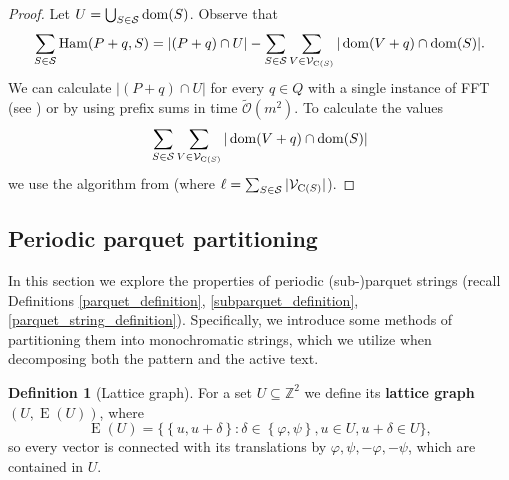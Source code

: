 \documentclass[11pt]{article}
\newcommand{\Z}{\mathbb{Z}}
\newcommand{\tO}{\tilde{\mathcal{O}}}
\renewcommand{\phi}{\varphi}
\newcommand{\set}[1]{\left\lbrace #1 \right\rbrace}
\newcommand{\bigset}[1]{\big \lbrace #1 \big \rbrace}
\theoremstyle{plain}
\theoremstyle{definition}
\newtheorem{definition}{Definition}
\theoremstyle{remark}
\DeclareMathOperator*{\Edges}{E}
\DeclareMathOperator*{\Ham}{Ham}
\begin{document}
\SparseAlgo
\begin{proof}
	Let $U = \bigcup_{S \in \mathcal{S}} \operatorname*{dom}(S)$. Observe that
	\[ \sum_{S \in \S} \Ham(P + q, S) = |(P + q) \cap U| - \sum_{S \in \S}\sum_{V \in \V_{\getchar{S}}} |\d{V + q} \cap \d{S}|.\]
	We can calculate $|(P + q) \cap U|$ for every $q \in Q$ with a single instance of FFT (see ) or by using prefix sums in time $\tO(m^2)$.
	To calculate the values
	\[ \sum_{S \in \mathcal{S}}\sum_{V \in \mathcal{V}_{\operatorname*{C}(S)}} |\operatorname*{dom}(V + q) \cap \operatorname*{dom}(S)| \]
	we use the algorithm from  (where $\ell = \sum_{S \in \mathcal{S}} |\mathcal{V}_{\operatorname*{C}(S)}|$).
\end{proof}


\subsection{Periodic parquet partitioning} \label{parquet_decomposition_proof}
In this section we explore the properties of periodic (sub-)parquet strings (recall Definitions \ref{parquet_definition}, \ref{subparquet_definition}, \ref{parquet_string_definition}).
Specifically, we introduce some methods of partitioning them into monochromatic strings, which we utilize when decomposing both the pattern and the active text.

\begin{definition}[Lattice graph]
	For a set $U \subseteq \Z^2$ we define its \textbf{lattice graph} $(U, \Edges(U))$, where
	\[ \Edges(U) = \bigset{\set{u, u + \delta} : \delta \in \set{\phi, \psi}, u \in U, u + \delta \in U},\] 
	so every vector is connected with its translations by $\phi, \psi, -\phi, -\psi$, which are contained in $U$.
\end{definition}
\end{document}
